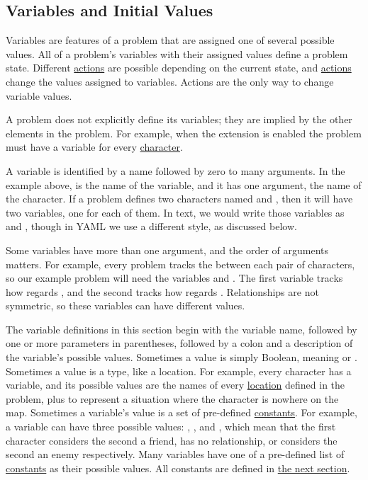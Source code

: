 \documentclass{nilreport}
\begin{document}
\newpage

\subsection{Variables and Initial Values} \label{sec:variables}

Variables are features of a problem that are assigned one of several possible values. All of a problem's variables with their assigned values define a problem state. Different \hyperref[sec:actions]{actions} are possible depending on the current state, and \hyperref[sec:actions]{actions} change the values assigned to variables. Actions are the only way to change variable values.

A problem does not explicitly define its variables; they are implied by the other elements in the problem. For example, when the  extension is enabled the problem must have a  variable for every \hyperref[sec:characters]{character}.

A variable is identified by a name followed by zero to many arguments. In the example above,  is the name of the variable, and it has one argument, the name of the character. If a problem defines two characters named  and , then it will have two  variables, one for each of them. In text, we would write those variables as  and , though in YAML we use a different style, as discussed below.

Some variables have more than one argument, and the order of arguments matters. For example, every problem tracks the  between each pair of characters, so our example problem will need the variables  and . The first variable tracks how  regards , and the second tracks how  regards . Relationships are not symmetric, so these variables can have different values.

The variable definitions in this section begin with the variable name, followed by one or more parameters in parentheses, followed by a colon and a description of the variable's possible values. Sometimes a value is simply Boolean, meaning  or . Sometimes a value is a type, like a location. For example, every character has a  variable, and its possible values are the names of every \hyperref[sec:locations]{location} defined in the problem, plus \None to represent a situation where the character is nowhere on the map. Sometimes a variable's value is a set of pre-defined \hyperref[sec:constants]{constants}. For example, a  variable can have three possible values: , \None, and , which mean that the first character considers the second a friend, has no relationship, or considers the second an enemy respectively. Many variables have one of a pre-defined list of \hyperref[sec:constants]{constants} as their possible values. All constants are defined in \hyperref[sec:constants]{the next section}.
\end{document}
